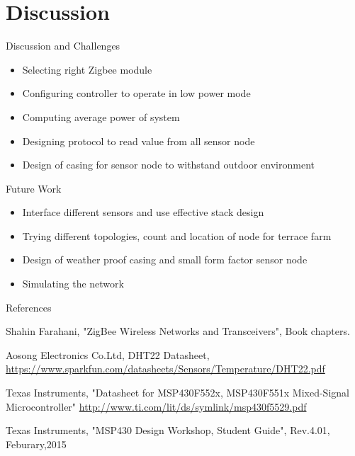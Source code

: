 \documentclass[t]{beamer} %
\begin{document}
\section{Discussion}
\begin{frame}{Discussion and Challenges}
\begin{itemize}
\item Selecting right Zigbee module \\[0.5cm]
\item Configuring controller to operate in low power mode  \\[0.5cm]
\item Computing average power of system \\[0.5cm]
\item Designing protocol to read value from all sensor node \\[0.5cm]
\item Design of casing for sensor node to withstand outdoor environment \\[0.5cm]
\end{itemize}
\end{frame}

\begin{frame}{Future Work}
\begin{itemize}
\item Interface different sensors and use effective stack design \\[1cm]
\item Trying different topologies, count and location of node for terrace farm\\[1cm]
\item Design of weather proof casing and small form factor sensor node \\[1cm]
\item Simulating the network 
\end{itemize}
\end{frame}

\begin{frame}{References}
\begin{thebibliography}{9}
 Shahin Farahani, "ZigBee Wireless Networks and Transceivers", Book chapters.

 Aosong Electronics Co.Ltd, DHT22 Datasheet, \url{https://www.sparkfun.com/datasheets/Sensors/Temperature/DHT22.pdf} 

 Texas Instruments, "Datasheet for MSP430F552x, MSP430F551x Mixed-Signal Microcontroller" \url{http://www.ti.com/lit/ds/symlink/msp430f5529.pdf}

 Texas Instruments, "MSP430 Design Workshop, Student Guide", Rev.4.01, Feburary,2015
\end{thebibliography}
\end{frame}
\end{document}
